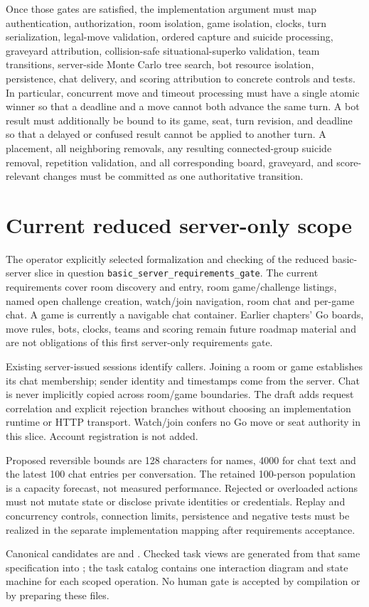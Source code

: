 \documentclass[11pt,oneside]{book}
\begin{document}
Once those gates are satisfied, the implementation argument must map authentication, authorization, room isolation, game isolation, clocks, turn serialization, legal-move validation, ordered capture and suicide processing, graveyard attribution, collision-safe situational-superko validation, team transitions, server-side Monte Carlo tree search, bot resource isolation, persistence, chat delivery, and scoring attribution to concrete controls and tests. In particular, concurrent move and timeout processing must have a single atomic winner so that a deadline and a move cannot both advance the same turn. A bot result must additionally be bound to its game, seat, turn revision, and deadline so that a delayed or confused result cannot be applied to another turn. A placement, all neighboring removals, any resulting connected-group suicide removal, repetition validation, and all corresponding board, graveyard, and score-relevant changes must be committed as one authoritative transition.


\chapter{Current reduced server-only scope}
The operator explicitly selected formalization and checking of the reduced
basic-server slice in question \texttt{basic\_server\_requirements\_gate}.
The current requirements cover room discovery and entry, room game/challenge
listings, named open challenge creation, watch/join navigation, room chat and
per-game chat. A game is currently a navigable chat container. Earlier chapters'
Go boards, move rules, bots, clocks, teams and scoring remain future roadmap
material and are not obligations of this first server-only requirements gate.

Existing server-issued sessions identify callers. Joining a room or game
establishes its chat membership; sender identity and timestamps come from the
server. Chat is never implicitly copied across room/game boundaries. The draft
adds request correlation and explicit rejection branches without choosing an
implementation runtime or HTTP transport. Watch/join confers no Go move or seat
authority in this slice. Account registration is not added.

Proposed reversible bounds are 128 characters for names, 4000 for chat text and
the latest 100 chat entries per conversation. The retained 100-person population
is a capacity forecast, not measured performance. Rejected or overloaded actions
must not mutate state or disclose private identities or credentials. Replay and
concurrency controls, connection limits, persistence and negative tests must be
realized in the separate implementation mapping after requirements acceptance.

Canonical candidates are  and
. Checked task views are generated from that same
specification into ; the task catalog contains one
interaction diagram and state machine for each scoped operation. No human gate
is accepted by compilation or by preparing these files.
\end{document}
